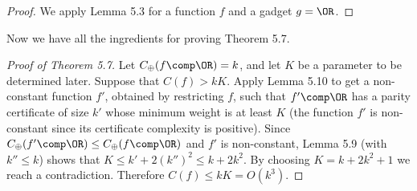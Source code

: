 \begin{proof}
We apply Lemma 5.3 for a function $f$ and a gadget $g=\OR$.
\end{proof}
Now we have all the ingredients for proving Theorem 5.7.
\begin{proof}[Proof of Theorem 5.7]
Let $C_\oplus(f\comp\OR)=k$, and let $K$ be a parameter to be determined later. Suppose that $C(f)>kK$. Apply Lemma 5.10 to get a non-constant function $f'$, obtained by restricting $f$, such that $f'\comp\OR$ has a parity certificate of size $k'$ whose minimum weight is at least $K$ (the function $f'$ is non-constant since its certificate complexity is positive). Since $C_\oplus(f'\comp\OR)\le C_\oplus(f\comp\OR)$ and $f'$ is non-constant, Lemma 5.9 (with $k''\le k$) shows that $K\le k'+2(k'')^2\le k+2k^2$. By choosing $K=k+2k^2+1$ we reach a contradiction. Therefore $C(f)\le kK=O(k^3)$.
\end{proof}
